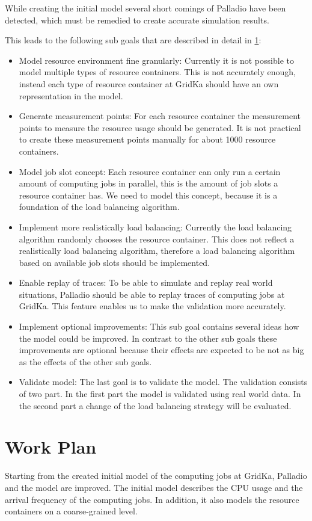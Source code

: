 While creating the initial model several short comings of Palladio have been detected, which must be remedied to create accurate simulation results. 

This leads to the following sub goals that are described in detail in \cref{plan}: 
\begin{itemize}
	\item Model resource environment fine granularly: Currently it is not possible to model multiple types of resource containers. This is not accurately enough, instead each type of resource container at GridKa should have an own representation in the model.
	\item Generate measurement points: For each resource container the measurement points to measure the resource usage should be generated. It is not practical to create these measurement points manually for about 1000 resource containers.
	\item Model job slot concept: Each resource container can only run a certain amount of computing jobs in parallel, this is the amount of job slots a resource container has. We need to model this concept, because it is a foundation of the load balancing algorithm.
	\item Implement more realistically load balancing: Currently the load balancing algorithm randomly chooses the resource container. This does not reflect a realistically load balancing algorithm, therefore a load balancing algorithm based on available job slots should be implemented.
	\item Enable replay of traces: To be able to simulate and replay real world situations, Palladio should be able to replay traces of computing jobs at GridKa. This feature enables us to make the validation more accurately.
	\item Implement optional improvements: This sub goal contains several ideas how the model could be improved. In contrast to the other sub goals these improvements are optional because their effects are expected to be not as big as the effects of the other sub goals. 
	\item Validate model: The last goal is to validate the model. The validation consists of two part. In the first part the model is validated using real world data. In the second part a change of the load balancing strategy will be evaluated.
\end{itemize}


\chapter{Work Plan}
\label{plan}
Starting from the created initial model of the computing jobs at GridKa, Palladio and the model are improved.
The initial model describes the CPU usage and the arrival frequency of the computing jobs. In addition, it also models the resource containers on a coarse-grained level.

